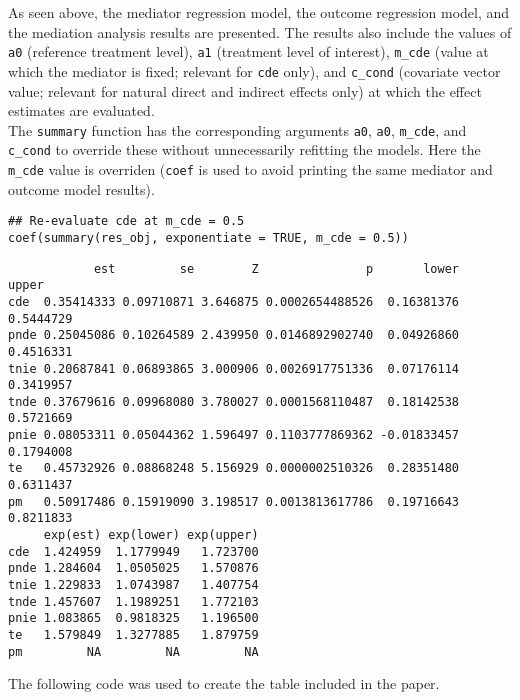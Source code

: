 \documentclass[dvipdfmx,10pt]{article}
\begin{document}
\normalsize

As seen above, the mediator regression model, the outcome regression model, and the mediation analysis results are presented. The results also include the values of \texttt{a0} (reference treatment level), \texttt{a1} (treatment level of interest), \texttt{m\_cde} (value at which the mediator is fixed; relevant for \texttt{cde} only), and \texttt{c\_cond} (covariate vector value; relevant for natural direct and indirect effects only) at which the effect estimates are evaluated.\\

The \texttt{summary} function has the corresponding arguments \texttt{a0}, \texttt{a0}, \texttt{m\_cde}, and \texttt{c\_cond} to override these without unnecessarily refitting the models. Here the \texttt{m\_cde} value is overriden (\texttt{coef} is used to avoid printing the same mediator and outcome model results).

\scriptsize
\begin{verbatim}
## Re-evaluate cde at m_cde = 0.5
coef(summary(res_obj, exponentiate = TRUE, m_cde = 0.5))
\end{verbatim}

\begin{verbatim}
            est         se        Z               p       lower     upper
cde  0.35414333 0.09710871 3.646875 0.0002654488526  0.16381376 0.5444729
pnde 0.25045086 0.10264589 2.439950 0.0146892902740  0.04926860 0.4516331
tnie 0.20687841 0.06893865 3.000906 0.0026917751336  0.07176114 0.3419957
tnde 0.37679616 0.09968080 3.780027 0.0001568110487  0.18142538 0.5721669
pnie 0.08053311 0.05044362 1.596497 0.1103777869362 -0.01833457 0.1794008
te   0.45732926 0.08868248 5.156929 0.0000002510326  0.28351480 0.6311437
pm   0.50917486 0.15919090 3.198517 0.0013813617786  0.19716643 0.8211833
     exp(est) exp(lower) exp(upper)
cde  1.424959  1.1779949   1.723700
pnde 1.284604  1.0505025   1.570876
tnie 1.229833  1.0743987   1.407754
tnde 1.457607  1.1989251   1.772103
pnie 1.083865  0.9818325   1.196500
te   1.579849  1.3277885   1.879759
pm         NA         NA         NA
\end{verbatim}

\normalsize

The following code was used to create the table included in the paper.
\end{document}
